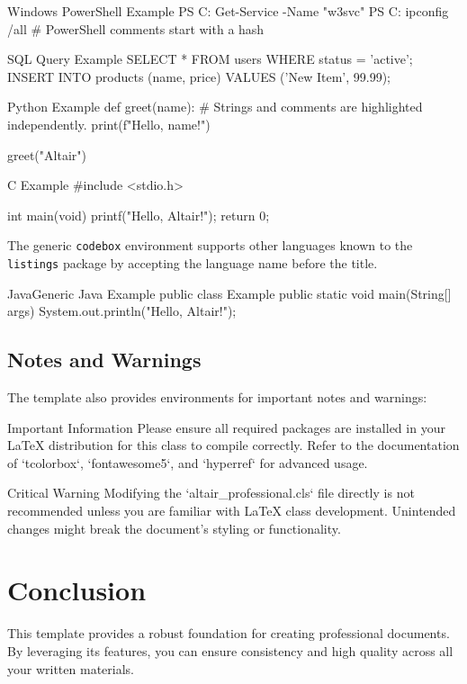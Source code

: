 \documentclass{altair_professional}
\begin{document}
\begin{powershell}{Windows PowerShell Example}
  PS C:\> Get-Service -Name "w3svc"
  PS C:\> ipconfig /all
  # PowerShell comments start with a hash
\end{powershell}

\begin{sqlbox}{SQL Query Example}
  SELECT * FROM users WHERE status = 'active';
  INSERT INTO products (name, price) VALUES ('New Item', 99.99);
\end{sqlbox}

\begin{pythonbox}{Python Example}
  def greet(name):
      # Strings and comments are highlighted independently.
      print(f"Hello, {name}!")

  greet("Altair")
\end{pythonbox}

\begin{cbox}{C Example}
  #include <stdio.h>

  int main(void) {
      printf("Hello, Altair!\n");
      return 0;
  }
\end{cbox}

The generic \texttt{codebox} environment supports other languages known to the
\texttt{listings} package by accepting the language name before the title.

\begin{codebox}{Java}{Generic Java Example}
  public class Example {
      public static void main(String[] args) {
          System.out.println("Hello, Altair!");
      }
  }
\end{codebox}

\subsection{Notes and Warnings}
The template also provides environments for important notes and warnings:

\begin{infoNote}{Important Information}
  Please ensure all required packages are installed in your LaTeX distribution for this class to compile correctly.
  Refer to the documentation of `tcolorbox`, `fontawesome5`, and `hyperref` for advanced usage.
\end{infoNote}

\begin{warningBox}{Critical Warning}
  Modifying the `altair\_professional.cls` file directly is not recommended unless you are familiar with LaTeX class development. Unintended changes might break the document's styling or functionality.
\end{warningBox}

\section{Conclusion}
This template provides a robust foundation for creating professional documents. By leveraging its features, you can ensure consistency and high quality across all your written materials.
\end{document}
